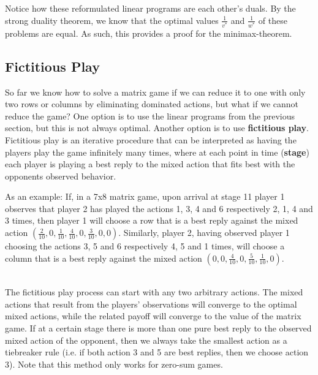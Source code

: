 \documentclass[12pt]{article}
\begin{document}
\noindent
Notice how these reformulated linear programs are each other's duals.
By the strong duality theorem, we know that the optimal values $\frac{1}{v^*}$ and $\frac{1}{w^*}$ of these problems are equal.
As such, this provides a proof for the minimax-theorem.

\subsection{Fictitious Play}
So far we know how to solve a matrix game if we can reduce it to one with only two rows or columns by eliminating dominated actions, but what if we cannot reduce the game?
One option is to use the linear programs from the previous section, but this is not always optimal.
Another option is to use \textbf{fictitious play}.
Fictitious play is an iterative procedure that can be interpreted as having the players play the game infinitely many times, where at each point in time (\textbf{stage}) each player is playing a best reply to the mixed action that fits best with the opponents observed behavior.

\newpage
\noindent
As an example:
If, in a 7x8 matrix game, upon arrival at stage 11 player 1 observes that player 2 has played the actions 1, 3, 4 and 6 respectively 2, 1, 4 and 3 times, then player 1 will choose a row that is a best reply against the mixed action $(\frac{2}{10}, 0, \frac{1}{10}, \frac{4}{10}, 0, \frac{3}{10}, 0, 0)$.
Similarly, player 2, having observed player 1 choosing the actions 3, 5 and 6 respectively 4, 5 and 1 times, will choose a column that is a best reply against the mixed action $(0, 0, \frac{4}{10}, 0, \frac{5}{10}, \frac{1}{10}, 0)$.

\noindent
\\
The fictitious play process can start with any two arbitrary actions.
The mixed actions that result from the players' observations will converge to the optimal mixed actions, while the related payoff will converge to the value of the matrix game.
If at a certain stage there is more than one pure best reply to the observed mixed action of the opponent, then we always take the smallest action as a tiebreaker rule (i.e. if both action 3 and 5 are best replies, then we choose action 3).
Note that this method only works for zero-sum games.

%
%
\newpage
\end{document}
